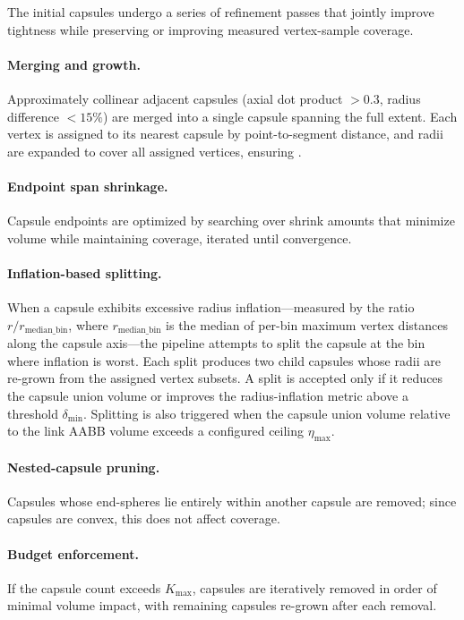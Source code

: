 The initial capsules undergo a series of refinement passes that jointly improve tightness while preserving or improving measured vertex-sample coverage.

\paragraph{Merging and growth.}
Approximately collinear adjacent capsules (axial dot product $> 0.3$, radius difference $< 15\%$) are merged into a single capsule spanning the full extent. Each vertex is assigned to its nearest capsule by point-to-segment distance, and radii are expanded to cover all assigned vertices, ensuring .

\paragraph{Endpoint span shrinkage.}
Capsule endpoints are optimized by searching over shrink amounts that minimize volume while maintaining coverage, iterated until convergence.

\paragraph{Inflation-based splitting.}
When a capsule exhibits excessive radius inflation---measured by the ratio $r / r_{\text{median\_bin}}$, where $r_{\text{median\_bin}}$ is the median of per-bin maximum vertex distances along the capsule axis---the pipeline attempts to split the capsule at the bin where inflation is worst.
Each split produces two child capsules whose radii are re-grown from the assigned vertex subsets.
A split is accepted only if it reduces the capsule union volume or improves the radius-inflation metric above a threshold $\delta_{\min}$.
Splitting is also triggered when the capsule union volume relative to the link AABB volume exceeds a configured ceiling $\eta_{\max}$.

\paragraph{Nested-capsule pruning.}
Capsules whose end-spheres lie entirely within another capsule are removed; since capsules are convex, this does not affect coverage.

\paragraph{Budget enforcement.}
If the capsule count exceeds $K_{\max}$, capsules are iteratively removed in order of minimal volume impact, with remaining capsules re-grown after each removal.

